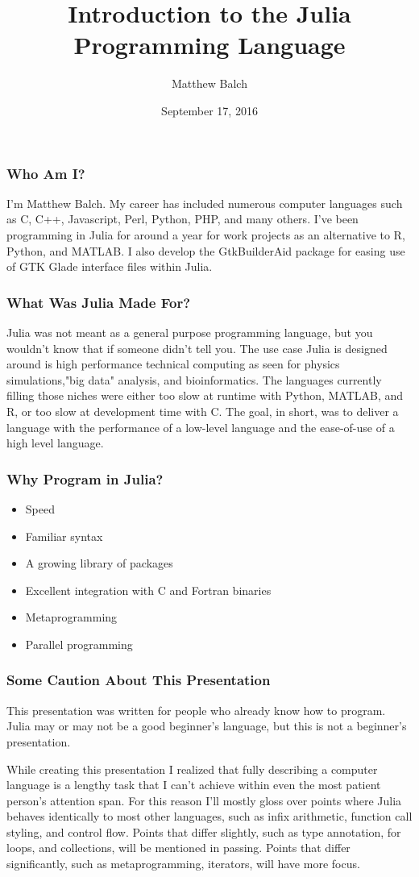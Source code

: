 \documentclass{beamer}
\title[Julia]{Introduction to the Julia Programming Language}
\author{Matthew Balch}
\institute{HackRVA}
\date{September 17, 2016}
\begin{document}
\frame{\titlepage}

\begin{frame}
\frametitle{Who Am I?}

I'm Matthew Balch. My career has included numerous computer languages such as
C, C++, Javascript, Perl, Python, PHP, and many others. I've been programming 
in Julia for around a year for work projects as an alternative to R, Python,
and MATLAB. I also develop the GtkBuilderAid package for easing use of GTK
Glade interface files within Julia.

\end{frame}

\begin{frame}
\frametitle{What Was Julia Made For?}
Julia was not meant as a general purpose programming language, but you wouldn't
know that if someone didn't tell you. The use case Julia is designed around is 
high performance technical computing as seen for physics simulations,"big data"
analysis, and bioinformatics. The languages currently filling those niches were
either too slow at runtime with Python, MATLAB, and R, or too slow at 
development time with C. The goal, in short, was to deliver a language with the
performance of a low-level language and the ease-of-use of a high level
language.
\end{frame}

\begin{frame}
\frametitle{Why Program in Julia?}
\begin{itemize}
  \item Speed
  \item Familiar syntax
  \item A growing library of packages
  \item Excellent integration with C and Fortran binaries
  \item Metaprogramming
  \item Parallel programming
\end{itemize}
\end{frame}

\begin{frame}
\frametitle{Some Caution About This Presentation}
This presentation was written for people who already know how to program. Julia
may or may not be a good beginner's language, but this is not a beginner's
presentation.

While creating this presentation I realized that fully describing a computer
language is a lengthy task that I can't achieve within even the most patient
person's attention span. For this reason I'll mostly gloss over points where
Julia behaves identically to most other languages, such as infix arithmetic,
function call styling, and control flow. Points that differ slightly, such
as type annotation, for loops, and collections, will be mentioned in passing.
Points that differ significantly, such as metaprogramming, iterators, will 
have more focus.
\end{frame}
\end{document}

